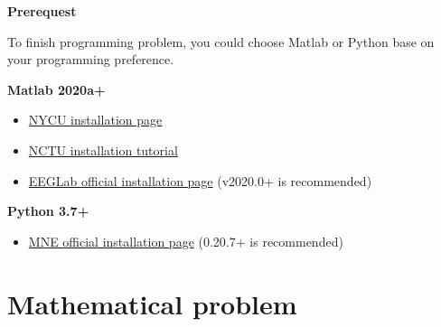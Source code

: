 \documentclass[a4 paper]{article}
\begin{document}
\noindent{\color{LightRubineRed} \rule{\linewidth}{0.1mm}}
\begin{center}
    \textbf{\large{Prerequest}}
\end{center}
To finish programming problem, you could choose Matlab or Python base on your programming preference.
\begin{multicols}{2}
\textbf{Matlab 2020a+}
\begin{itemize}
    \item \href{https://ca.nctu.edu.tw/installation/item/matlab-tah-standalone-ch}{NYCU installation page}
    \item \href{https://ca.nctu.edu.tw/manual/matlab/NCTU_MATLAB_TAH_stand_alone_installation_ch.pdf}{NCTU installation tutorial}
    \item \href{https://sccn.ucsd.edu/eeglab/downloadtoolbox.php}{EEGLab official installation page} (v2020.0+ is recommended)
\end{itemize}
\columnbreak
\textbf{Python 3.7+}
\begin{itemize}
    \item \href{https://mne.tools/stable/install/index.html}{MNE official installation page}  (0.20.7+ is recommended)
\end{itemize}
\end{multicols}
\noindent{\color{LightRubineRed} \rule{\linewidth}{0.1mm}}
\newpage
\section{Mathematical problem}
\end{document}

